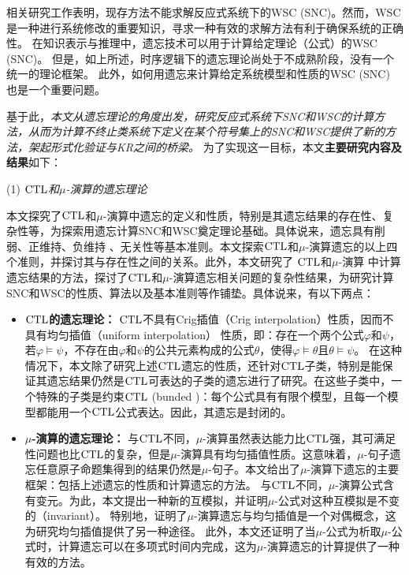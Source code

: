 相关研究工作表明，现存方法不能求解反应式系统下的WSC (SNC)。然而，WSC是一种进行系统修改的重要知识，寻求一种有效的求解方法有利于确保系统的正确性。
在知识表示与推理中，遗忘技术可以用于计算给定理论（公式）的WSC (SNC)。
但是，如上所述，时序逻辑下的遗忘理论尚处于不成熟阶段，没有一个统一的理论框架。
此外，如何用遗忘来计算给定系统模型和性质的WSC (SNC) 也是一个重要问题。

基于此，{\em 本文从遗忘理论的角度出发，研究反应式系统下SNC和WSC的计算方法，从而为计算不终止类系统下定义在某个符号集上的SNC和WSC提供了新的方法，架起形式化验证与KR之间的桥梁。}
为了实现这一目标，本文\textbf{主要研究内容及结果}如下：

(1) {\em $\textrm{CTL}$和$\mu$-演算的遗忘理论}

本文探究了$\textrm{CTL}$和$\mu$-演算中遗忘的定义和性质，特别是其遗忘结果的存在性、复杂性等，为探索用遗忘计算SNC和WSC奠定理论基础。具体说来，遗忘具有削弱、正维持、负维持 、无关性等基本准则\cite{Yan:AIJ:2009}。本文探索$\textrm{CTL}$和$\mu$-演算遗忘的以上四个准则，并探讨其与存在性之间的关系。此外，本文研究了 $\textrm{CTL}$和$\mu$-演算 中计算遗忘结果的方法，探讨了$\textrm{CTL}$和$\mu$-演算遗忘相关问题的复杂性结果，为研究计算SNC和WSC的性质、算法以及基本准则等作铺垫。具体说来，有以下两点：
\begin{itemize}
	\item \textbf{$\textrm{CTL}$的遗忘理论：}
	$\textrm{CTL}$不具有Crig插值（Crig interpolation）性质，因而不具有均匀插值（uniform interpolation） 性质\cite{Maksimova:JANCL:1991}，即：存在一个两个公式$\varphi$和$\psi$，若$\varphi \models \psi$，不存在由$\varphi$和$\psi$的公共元素构成的公式$\theta$，使得$\varphi \models \theta$且$\theta \models \psi$。
	在这种情况下，本文除了研究上述$\textrm{CTL}$遗忘的性质，还针对$\textrm{CTL}$子类，特别是能保证其遗忘结果仍然是$\textrm{CTL}$可表达的子类的遗忘进行了研究。在这些子类中，一个特殊的子类是约束$\textrm{CTL}$ (bunded \CTL)：每个公式具有有限个模型，且每一个模型都能用一个$\textrm{CTL}$公式表达。因此，其遗忘是封闭的。
	
	\item \textbf{$\mu$-演算的遗忘理论：}
	与$\textrm{CTL}$不同，$\mu$-演算虽然表达能力比$\textrm{CTL}$强，其可满足性问题也比$\textrm{CTL}$的复杂，但是$\mu$-演算具有均匀插值性质\cite{d2006modal}。这意味着，$\mu$-句子遗忘任意原子命题集得到的结果仍然是$\mu$-句子。本文给出了$\mu$-演算下遗忘的主要框架：包括上述遗忘的性质和计算遗忘的方法。
	与$\textrm{CTL}$不同，$\mu$-演算公式含有变元。为此，本文提出一种新的互模拟，并证明$\mu$-公式对这种互模拟是不变的（invariant）。
	特别地，证明了$\mu$-演算遗忘与均匀插值是一个对偶概念，这为研究均匀插值提供了另一种途径。
	此外，本文还证明了当$\mu$-公式为析取$\mu$-公式时，计算遗忘可以在多项式时间内完成，这为$\mu$-演算遗忘的计算提供了一种有效的方法。
\end{itemize}


